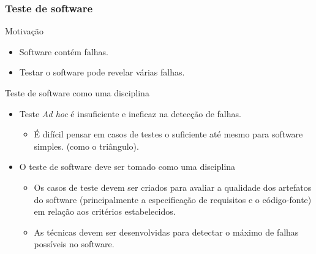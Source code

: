 \begin{frame}[parent={cmap:software-testing-foundations}, hasprev=false, hasnext=true]
\frametitle{Teste de software}

\begin{block:fact}{Motivação}
\begin{itemize}
	\item Software contém falhas.

	\item Testar o software pode revelar várias falhas.
\end{itemize}
\end{block:fact}

\begin{block:fact}{Teste de software como uma disciplina}
\begin{itemize}
	\item Teste \textit{Ad hoc} é insuficiente e ineficaz na detecção de falhas.
	\begin{itemize}
		\item É difícil pensar em casos de testes o suficiente até mesmo para software simples.
		(como o triângulo).
	\end{itemize}

	\item O teste de software deve ser tomado como uma disciplina
	\begin{itemize}
		\item Os casos de teste devem ser criados para avaliar a qualidade dos artefatos do software (principalmente a especificação de requisitos e o código-fonte) em relação aos critérios estabelecidos.

		\item As técnicas devem ser desenvolvidas para detectar o máximo de falhas possíveis no software.
	\end{itemize}
\end{itemize}
\end{block:fact}
\end{frame}


